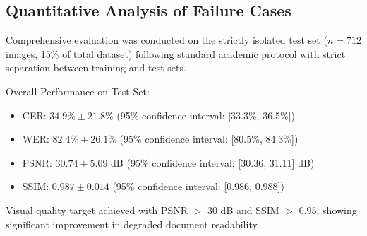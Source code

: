 \documentclass[journal]{IEEEtran}
\begin{document}
\subsection{Quantitative Analysis of Failure Cases}

Comprehensive evaluation was conducted on the strictly isolated test set ($n = 712$ images, 15\% of total dataset) following standard academic protocol with strict separation between training and test sets.

Overall Performance on Test Set:
\begin{itemize}
    \item CER: $34.9\% \pm 21.8\%$ (95\% confidence interval: [33.3\%, 36.5\%])
    \item WER: $82.4\% \pm 26.1\%$ (95\% confidence interval: [80.5\%, 84.3\%])
    \item PSNR: $30.74 \pm 5.09$ dB (95\% confidence interval: [30.36, 31.11] dB)
    \item SSIM: $0.987 \pm 0.014$ (95\% confidence interval: [0.986, 0.988])
\end{itemize}

Visual quality target achieved with PSNR $>$ 30 dB and SSIM $>$ 0.95, showing significant improvement in degraded document readability.
\end{document}
